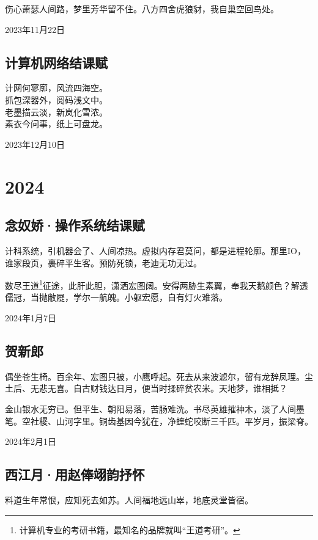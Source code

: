 \documentclass[a5paper]{ctexart}
\begin{document}
	伤心萧瑟人间路，梦里芳华留不住。八方四舍虎狼豺，我自巢空回鸟处。
	\begin{flushright}
		2023年11月22日
	\end{flushright}
	
	\subsection{计算机网络结课赋}
	\begin{center}
		计网何寥廓，风流四海空。\\
		抓包深器外，阅码浅文中。\\
		老墨描云淡，新岚化雪浓。\\
		素衣今问事，纸上可盘龙。
	\end{center}
	\hfill 2023年12月10日
	
	\newpage
	\section{2024}
	
	\subsection{念奴娇·操作系统结课赋}
	计科系统，引机器会了、人间凉热。虚拟内存君莫问，都是进程轮廓。那里IO，谁家段页，裹碎平生客。预防死锁，老迪无功无过。
	
	数尽王道\footnote{计算机专业的考研书籍，最知名的品牌就叫“王道考研”。}征途，此肝此胆，潇洒宏图阔。安得两胁生素翼，奉我天鹅颜色？解透儒冠，当抛敝屣，学尔一航魄。小躯宏愿，自有灯火难落。
	\begin{flushright}
		2024年1月7日
	\end{flushright}
	
	\subsection[贺新郎（偶坐苍生椅）]{贺新郎}
	偶坐苍生椅。百余年、宏图只被，小鹰呼起。死去从来波滤尔，留有龙辞凤理。尘土后、无悲无喜。自古财钱达日月，便当时揉碎贫农米。天地梦，谁相抵？
	
	金山银水无穷已。但平生、朝阳易落，苦肠难洗。书尽英雄摧神木，淡了人间墨笔。空社稷、山河字里。铜齿基因今犹在，净蝰蛇咬断三千匹。平岁月，振梁脊。
	\begin{flushright}
		2024年2月1日
	\end{flushright}
	
	\subsection{西江月·用赵俸翊韵抒怀}
	料道生年常恨，应知死去如苏。人间福地远山崒，地底灵堂皆宿。
	
\end{document}
